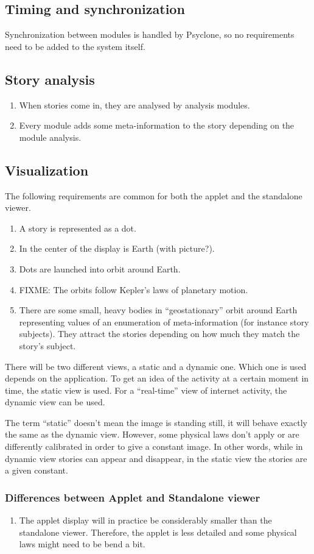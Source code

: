 \subsection{Timing and synchronization}

Synchronization between modules is handled by Psyclone, so no requirements need
to be added to the system itself.

\subsection{Story analysis}

\begin{enumerate}
  \item When stories come in, they are analysed by analysis modules.
  \item Every module adds some meta-information to the story depending on the
    module analysis.
\end{enumerate}

\subsection{Visualization}

The following requirements are common for both the applet and the standalone
viewer.

\begin{enumerate}
  \item A story is represented as a dot.
  \item In the center of the display is Earth (with picture?).
  \item Dots are launched into orbit around Earth.
  \item FIXME: The orbits follow Kepler's laws of planetary motion.
  \item There are some small, heavy bodies in ``geostationary'' orbit around
    Earth representing values of an enumeration of meta-information (for
    instance story subjects). They attract the stories depending on how much
    they match the story's subject. 
\end{enumerate}

There will be two different views, a static and a dynamic one. Which one is
used depends on the application. To get an idea of the activity at a certain
moment in time, the static view is used. For a ``real-time'' view of internet
activity, the dynamic view can be used.

The term ``static'' doesn't mean the image is standing still, it will behave
exactly the same as the dynamic view. However, some physical laws don't apply
or are differently calibrated in order to give a constant image. In other
words, while in dynamic view stories can appear and disappear, in the static
view the stories are a given constant.

\subsubsection{Differences between Applet and Standalone viewer}

\begin{enumerate}
  \item The applet display will in practice be considerably smaller than the
    standalone viewer. Therefore, the applet is less detailed and some physical
    laws might need to be bend a bit.
\end{enumerate}

